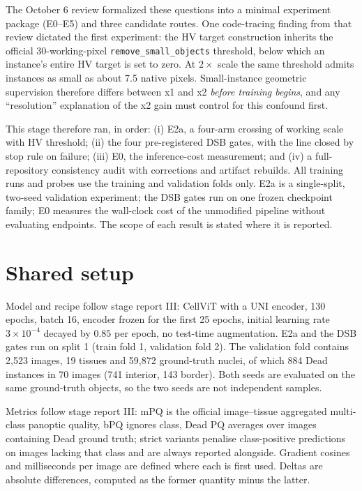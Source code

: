 \documentclass[11pt,a4paper]{article}
\newcommand{\code}[1]{\nolinkurl{#1}}
\begin{document}
The October 6 review formalized these questions into a minimal experiment package (E0--E5) and three candidate routes\cite{next}. One code-tracing finding from that review dictated the first experiment: the HV target construction inherits the official 30-working-pixel \code{remove\_small\_objects} threshold, below which an instance's entire HV target is set to zero. At $2\times$ scale the same threshold admits instances as small as about 7.5 native pixels. Small-instance geometric supervision therefore differs between x1 and x2 \emph{before training begins}, and any ``resolution'' explanation of the x2 gain must control for this confound first.

This stage therefore ran, in order: (i) E2a, a four-arm crossing of working scale with HV threshold; (ii) the four pre-registered DSB gates, with the line closed by stop rule on failure; (iii) E0, the inference-cost measurement; and (iv) a full-repository consistency audit with corrections and artifact rebuilds. All training runs and probes use the training and validation folds only. E2a is a single-split, two-seed validation experiment; the DSB gates run on one frozen checkpoint family; E0 measures the wall-clock cost of the unmodified pipeline without evaluating endpoints. The scope of each result is stated where it is reported.

\section{Shared setup}

Model and recipe follow stage report III: CellViT with a UNI\cite{uni} encoder\cite{cellvit}, 130 epochs, batch 16, encoder frozen for the first 25 epochs, initial learning rate $3\times10^{-4}$ decayed by $0.85$ per epoch, no test-time augmentation. E2a and the DSB gates run on split 1 (train fold 1, validation fold 2). The validation fold contains 2,523 images, 19 tissues and 59,872 ground-truth nuclei, of which 884 Dead instances in 70 images (741 interior, 143 border). Both seeds are evaluated on the same ground-truth objects, so the two seeds are not independent samples.

Metrics follow stage report III: mPQ is the official image--tissue aggregated multi-class panoptic quality, bPQ ignores class, Dead PQ averages over images containing Dead ground truth; strict variants penalise class-positive predictions on images lacking that class and are always reported alongside. Gradient cosines and milliseconds per image are defined where each is first used. Deltas are absolute differences, computed as the former quantity minus the latter.
\end{document}

